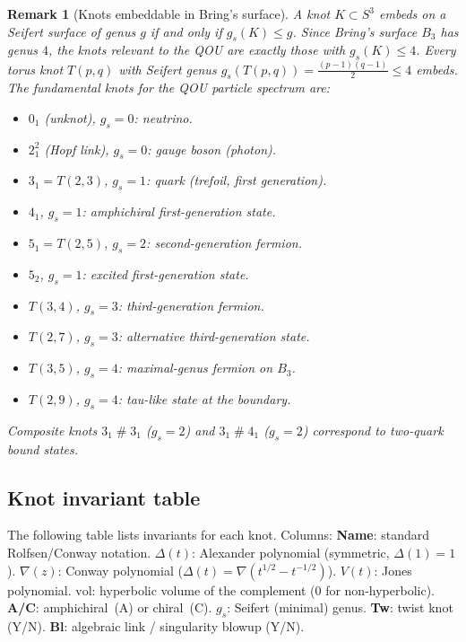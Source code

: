 \documentclass[12pt,a4paper]{report}
\newtheorem{remark}[theorem]{Remark}
\providecommand{\DIFaddtex}[1]{{\protect\color{DIFgreen} \sf #1}} %
\providecommand{\DIFadd}[1]{\texorpdfstring{\DIFaddtex{#1}}{#1}} %
\begin{document}
\begin{remark}[Knots embeddable in Bring's surface]
\DIFadd{\label{rem:knots-embeddable}
A knot $K \subset S^3$ embeds on a Seifert surface of genus $g$ if and
only if $g_s(K) \le g$.  Since Bring's surface $B_3$ has genus $4$, the
knots relevant to the QOU are exactly those with $g_s(K) \le 4$.  Every
torus knot $T(p,q)$ with Seifert genus
$g_s(T(p,q)) = \tfrac{(p-1)(q-1)}{2} \le 4$ embeds.  The fundamental
knots for the QOU particle spectrum are:
}\begin{itemize}
  \item \DIFadd{$0_1$ (unknot), $g_s=0$: neutrino.
  }\item \DIFadd{$2^2_1$ (Hopf link), $g_s=0$: gauge boson (photon).
  }\item \DIFadd{$3_1 = T(2,3)$, $g_s=1$: quark (trefoil, first generation).
  }\item \DIFadd{$4_1$, $g_s=1$: amphichiral first-generation state.
  }\item \DIFadd{$5_1 = T(2,5)$, $g_s=2$: second-generation fermion.
  }\item \DIFadd{$5_2$, $g_s=1$: excited first-generation state.
  }\item \DIFadd{$T(3,4)$, $g_s=3$: third-generation fermion.
  }\item \DIFadd{$T(2,7)$, $g_s=3$: alternative third-generation state.
  }\item \DIFadd{$T(3,5)$, $g_s=4$: maximal-genus fermion on $B_3$.
  }\item \DIFadd{$T(2,9)$, $g_s=4$: tau-like state at the boundary.
}\end{itemize}
\DIFadd{Composite knots $3_1 \mathbin{\#} 3_1$ ($g_s=2$) and
$3_1 \mathbin{\#} 4_1$ ($g_s=2$) correspond to two-quark bound
states.
}\end{remark}

\subsection{\DIFadd{Knot invariant table}}
\DIFadd{\label{subsec:knot-invariant-table}
}

\DIFadd{The following table lists invariants for each knot.  Columns:
\textbf{Name}: standard Rolfsen/Conway notation.
\textbf{$\Delta(t)$}: Alexander polynomial (symmetric, $\Delta(1)=1$).
\textbf{$\nabla(z)$}: Conway polynomial ($\Delta(t)=\nabla(t^{1/2}-t^{-1/2})$).
\textbf{$V(t)$}: Jones polynomial.
\textbf{$\mathrm{vol}$}: hyperbolic volume of the complement ($0$ for
non-hyperbolic).
\textbf{A/C}: amphichiral~(A) or chiral~(C).
\textbf{$g_s$}: Seifert (minimal) genus.
\textbf{Tw}: twist knot (Y/N).
\textbf{Bl}: algebraic link / singularity blowup (Y/N).
}
\end{document}
